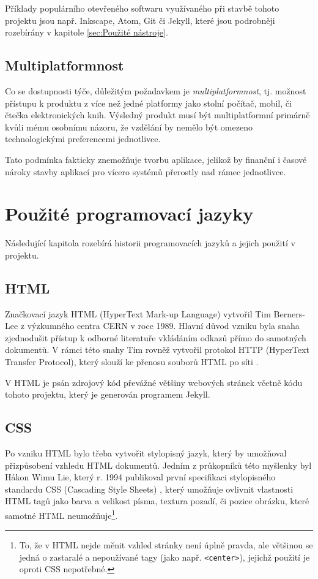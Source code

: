 \documentclass[a4paper, 12pt]{article}
\begin{document}
  Příklady populárního otevřeného softwaru využívaného při stavbě tohoto projektu jsou např. Inkscape, Atom, Git či Jekyll, které jsou podrobněji rozebírány v kapitole \ref{sec:Použité nástroje}.


  \subsection{Multiplatformnost}
  Co se dostupnosti týče, důležitým požadavkem je \emph{multiplatformnost}, tj. možnost přístupu k produktu z více než jedné platformy jako stolní počítač, mobil, či čtečka elektronických knih. Výsledný produkt musí být multiplatformní primárně kvůli mému osobnímu názoru, že vzdělání by nemělo být omezeno technologickými preferencemi jednotlivce.

  Tato podmínka fakticky znemožňuje tvorbu aplikace, jelikož by finanční i časové nároky stavby aplikací pro vícero systémů přerostly nad rámec jednotlivce.


  \section{Použité programovací jazyky}
  Následující kapitola rozebírá historii programovacích jazyků a jejich použití v projektu.


  \subsection{HTML} \label{sec:HTML}
  Značkovací jazyk HTML (HyperText Mark-up Language) vytvořil Tim Berners-Lee z výzkumného centra CERN v roce 1989. Hlavní důvod vzniku byla snaha zjednodušit přístup k odborné literatuře vkládáním odkazů přímo do samotných dokumentů. V rámci této snahy Tim rovněž vytvořil protokol HTTP (HyperText Transfer Protocol), který slouží ke přenosu souborů HTML po síti \cite{html-history}.


  V HTML je psán zdrojový kód převážné většiny webových stránek včetně kódu tohoto projektu, který je generován programem Jekyll.


  \subsection{CSS} \label{sec:CSS}
  Po vzniku HTML bylo třeba vytvořit stylopisný jazyk, který by umožňoval přizpůsobení vzhledu HTML dokumentů. Jedním z průkopníků této myšlenky byl Håkon Wimu Lie, který r. 1994 publikoval první specifikaci stylopisného standardu CSS (Cascading Style Sheets) \cite{css-proposal, css-saga}, který umožňuje ovlivnit vlastnosti HTML tagů jako barva a velikost písma, textura pozadí, či pozice obrázku, které samotné HTML neumožňuje\footnote{To, že v HTML nejde měnit vzhled stránky není úplně pravda, ale většinou se jedná o zastaralé a nepoužívané tagy (jako např. \texttt{<center>}), jejichž použití je oproti CSS nepotřebné.}.
\end{document}
